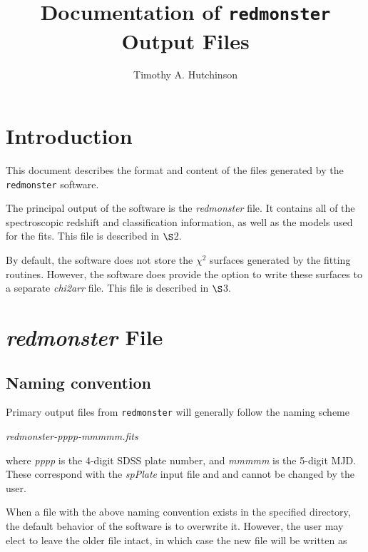 \documentclass[12pt]{article}
\begin{document}
\title{Documentation of \texttt{redmonster} Output Files}

\author{Timothy A. Hutchinson}

\maketitle

\section{Introduction}

This document describes the format and content of the files
generated by the \texttt{redmonster} software.

The principal output of the software is the \textit{redmonster} file.  It contains all of the
spectroscopic redshift and classification information, as well as the models used for the fits.
This file is described in $\S$2.

By default, the software does not store the $\chi^2$ surfaces generated by
the fitting routines.  However, the software does provide the option to write these surfaces
to a separate \textit{chi2arr} file.  This file is described in $\S$3.

\section{\textit{redmonster} File}

\subsection{Naming convention}

Primary output files from \texttt{redmonster} will generally follow the naming scheme

\begin{center}
	\textit{redmonster-pppp-mmmmm.fits}
\end{center}

where \textit{pppp} is the 4-digit SDSS plate number, and \textit{mmmmm}
is the 5-digit MJD.  These correspond with the \textit{spPlate} input file and
and cannot be changed by the user.

When a file with the above naming convention exists in the specified directory, 
the default behavior of the software is to overwrite it.  However, the user may 
elect to leave the older file intact, in which case the new file will be written as
\end{document}
